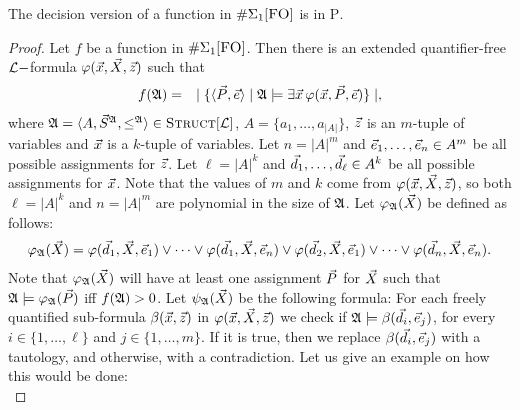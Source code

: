 \begin{theo} \label{decisionptime}
The decision version of a function in $\E1$ is in \textsc{P}.
\end{theo}
\begin{proof}
Let $f$ be a function in $\E1$. Then there is an extended quantifier-free $\L-$formula $\varphi(\x,\X,\z)$ such that
\begin{eqnarray*}
f(\A) &=& \mid \{ \langle\P,\e\rangle \mid \A \models \exists \x \, \varphi(\x,\P,\e) \} \mid,
\end{eqnarray*}
where $\A = \langle A, \S^{\A}, \leq^{\A} \rangle \in \Truc$, $A = \{a_1,\ldots,a_{\vert A \vert}\}$, $\z$ is an $m$-tuple of variables and $\x$ is a $k$-tuple of variables. Let $n = \vert A \vert^m$ and $\e_1,\dots,\e_n \in A^m$ be all possible assignments for $\z$. Let $\ell = \vert A \vert^k$ and $\d_1,\dots,\d_\ell\in A^k$ be all possible assignments for $\x$. Note that the values of $m$ and $k$ come from $\varphi(\x,\X,\z)$, so both $\ell = \vert A \vert^k$ and $n=\vert A \vert^m$ are polynomial in the size of $\A$. Let $\varphi_\A(\X)$ be defined as follows:
\begin{eqnarray*}
\varphi_\A(\X) = \varphi(\d_1,\X,\e_1) \vee \cdots \vee \varphi(\d_1,\X,\e_n) \vee \varphi(\d_2,\X,\e_1) \vee \cdots \vee \varphi(\d_n,\X,\e_n).
\end{eqnarray*}
Note that $\varphi_\A(\X)$ will have at least one assignment $\P$ for $\X$ such that $\A\models\varphi_\A(\P)$ iff $f(\A)>0$. Let $\psi_\A(\X)$ be the following formula: For each freely quantified sub-formula $\beta(\x,\z)$ in $\varphi(\x,\X,\z)$ we check if $\A \models \beta(\d_i,\e_j)$, for every $i\in\{1,\ldots,\ell\}$ and $j\in\{1,\ldots,m\}$. If it is true, then we replace $\beta(\d_i,\e_j)$ with a tautology, and otherwise, with a contradiction. Let us give an example on how this would be done: \\


\end{proof}
